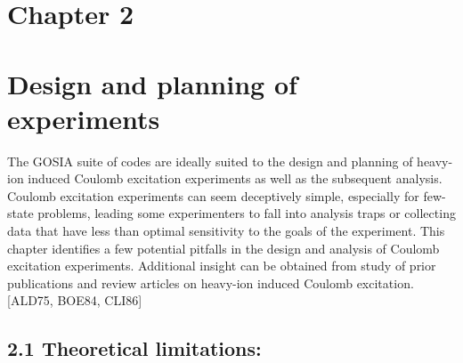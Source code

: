 \documentclass[10pt]{article}
\begin{document}
\section*{Chapter 2}
\section*{Design and planning of experiments }
The GOSIA suite of codes are ideally suited to the design and planning of heavy-ion induced Coulomb excitation experiments as well as the subsequent analysis. Coulomb excitation experiments can seem deceptively simple, especially for few-state problems, leading some experimenters to fall into analysis traps or collecting data that have less than optimal sensitivity to the goals of the experiment. This chapter identifies a few potential pitfalls in the design and analysis of Coulomb excitation experiments. Additional insight can be obtained from study of prior publications and review articles on heavy-ion induced Coulomb excitation. [ALD75, BOE84, CLI86]

\subsection*{2.1 Theoretical limitations:}
\end{document}
